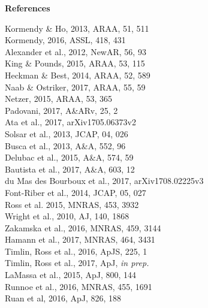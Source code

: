 \newpage
\begin{center}
\medskip
 \medskip
 {\large \bf References}
    \vspace{-10pt}
\end{center}
\begin{multicols}{2}[]
\noindent
{}\rbrack Kormendy \& Ho, 2013, ARAA, 51, 511\\
\rbrack Kormendy,  2016, ASSL, 418, 431\\
\rbrack Alexander et al., 2012, NewAR, 56, 93\\
\rbrack King \& Pounds, 2015, ARAA, 53, 115 \\
\rbrack Heckman \& Best, 2014, ARAA, 52, 589\\
\rbrack Naab \& Ostriker, 2017, ARAA, 55, 59 \\
\rbrack Netzer, 2015, ARAA, 53,  365\\
\rbrack Padovani, 2017, A\&ARv, 25, 2\\
\rbrack Ata et al., 2017, arXiv1705.06373v2\\
\rbrack Solsar et al., 2013, JCAP, 04, 026 \\
\rbrack Busca et al.,  2013, A\&A, 552, 96 \\
\rbrack Delubac et al.,  2015, A\&A, 574, 59 \\
\rbrack Bautista et al., 2017, A\&A, 603, 12 \\
\rbrack du Mas des Bourboux et al., 2017, arXiv1708.02225v3\\
\rbrack Font-Riber et al., 2014, JCAP, 05, 027\\
\rbrack Ross et al. 2015, MNRAS, 453, 3932\\
\rbrack Wright et al., 2010, AJ, 140, 1868\\
\rbrack Zakamska et al., 2016, MNRAS, 459, 3144\\
\rbrack Hamann et al., 2017, MNRAS, 464, 3431\\
\rbrack Timlin, Ross et al., 2016, ApJS, 225, 1\\
\rbrack Timlin, Ross et al., 2017, ApJ, {\it in prep.}\\
\rbrack LaMassa et al., 2015, ApJ, 800, 144\\
\rbrack Runnoe et al., 2016, MNRAS, 455, 1691\\
\rbrack Ruan et al, 2016, ApJ, 826, 188\\

\end{multicols}
